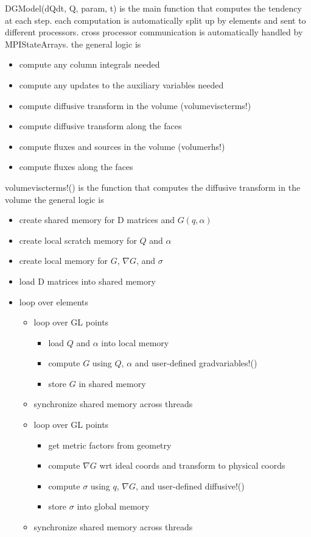 \documentclass{article}
\begin{document}
DGModel(dQdt, Q, param, t) is the main function that computes the tendency at each step. 
each computation is automatically split up by elements and sent to different processors. 
cross processor communication is automatically handled by MPIStateArrays. 
the general logic is
\begin{itemize}
    \item compute any column integrals needed
    \item compute any updates to the auxiliary variables needed
    \item compute diffusive transform in the volume (volumeviscterms!)
    \item compute diffusive transform along the faces
    \item compute fluxes and sources in the volume (volumerhs!)
    \item compute fluxes along the faces
\end{itemize}
volumeviscterms!() is the function that computes the diffusive transform in the volume
the general logic is
\begin{itemize}
    \item create shared memory for D matrices and $G(q, \alpha)$
    \item create local scratch memory for $Q$ and $\alpha$
    \item create local memory for $G$, $\nabla G$, and $\sigma$
    \item load D matrices into shared memory
    \item loop over elements
    \begin{itemize}
        \item loop over GL points
        \begin{itemize}
            \item load $Q$ and $\alpha$ into local memory
            \item compute $G$ using $Q$, $\alpha$ and user-defined gradvariables!()
            \item store $G$ in shared memory
        \end{itemize}
        \item synchronize shared memory across threads
        \item loop over GL points
        \begin{itemize}
            \item get metric factors from geometry 
            \item compute $\nabla G$ wrt ideal coords and transform to physical coords
            \item compute $\sigma$ using $q$, $\nabla G$, and user-defined diffusive!()
            \item store $\sigma$ into global memory
        \end{itemize}
        \item synchronize shared memory across threads
    \end{itemize}
\end{itemize}
\end{document}
